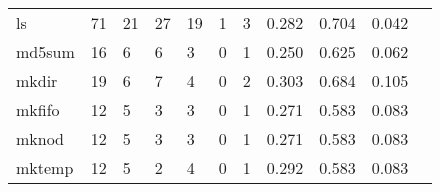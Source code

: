 \begin{longtable}{lp{1.2cm}p{1.2cm}p{1.2cm}p{1.2cm}p{1.2cm}p{1.2cm}p{1.2cm}p{1.2cm}p{1.2cm}p{1.2cm}}
ls        &                                    71 &                                                 21 &                                                 27 &                                                 19 &                                                  1 &                                                  3 &                                              0.282 &                                              0.704 &                                              0.042 \\
md5sum    &                                    16 &                                                  6 &                                                  6 &                                                  3 &                                                  0 &                                                  1 &                                              0.250 &                                              0.625 &                                              0.062 \\
mkdir     &                                    19 &                                                  6 &                                                  7 &                                                  4 &                                                  0 &                                                  2 &                                              0.303 &                                              0.684 &                                              0.105 \\
mkfifo    &                                    12 &                                                  5 &                                                  3 &                                                  3 &                                                  0 &                                                  1 &                                              0.271 &                                              0.583 &                                              0.083 \\
mknod     &                                    12 &                                                  5 &                                                  3 &                                                  3 &                                                  0 &                                                  1 &                                              0.271 &                                              0.583 &                                              0.083 \\
mktemp    &                                    12 &                                                  5 &                                                  2 &                                                  4 &                                                  0 &                                                  1 &                                              0.292 &                                              0.583 &                                              0.083 \\

\end{longtable}

